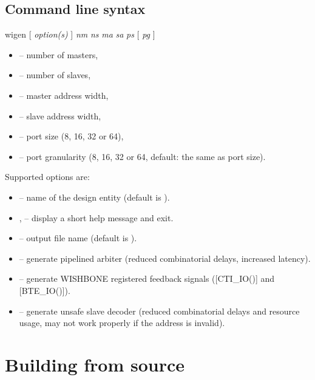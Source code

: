 \documentclass[a4paper,12pt,twoside,extrafontsizes]{memoir}
\begin{document}
\subsection{Command line syntax}

\begin{codepar}
	wigen [ \emph{option(s)} ] \emph{nm} \emph{ns} \emph{ma} \emph{sa} \emph{ps} [ \emph{pg} ]
\end{codepar}

\begin{itemize}
	\item{} -- number of masters,
	\item{} -- number of slaves,
	\item{} -- master address width,
	\item{} -- slave address width,
	\item{} -- port size (8, 16, 32 or 64),
	\item{} -- port granularity (8, 16, 32 or 64, default: the same as port size).
\end{itemize}

Supported options are:

\begin{itemize}
	\item {} -- name of the design entity (default is ).
	
	\item {},  -- display a short help message and exit.
	
	\item {} -- output file name (default is ).
	
	\item {} -- generate pipelined arbiter (reduced combinatorial delays, increased latency).
	
	\item {} -- generate WISHBONE registered feedback signals ([CTI\_IO()] and [BTE\_IO()]).
	
	\item {} -- generate unsafe slave decoder (reduced combinatorial delays and resource usage, may not work properly if the address is invalid).
\end{itemize}

\section{Building from source}
\label{sec:buildfromsource}
\end{document}
